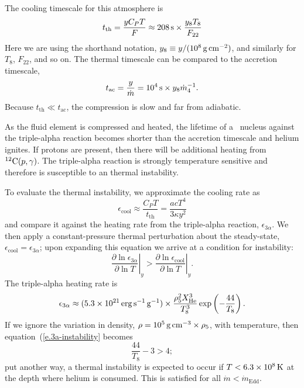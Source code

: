 The cooling timescale for this atmosphere is
\[ t_{\mathrm{th}} = \frac{yC_{P} T}{F} \approx 208\,\mathrm{s} \times \frac{y_{8} T_{8}}{F_{22}} \]
Here we are using the shorthand notation, $y_{8}\equiv y/(10^{8}\,\mathrm{g}\,{\mathrm{c}\mathrm{m}}^{-2})$, and similarly for $T_{8}$, $F_{22}$, and so on.
The thermal timescale can be compared to the accretion timescale,
\[ t_{\mathrm{ac}} = \frac{y}{\dot{m}} = 10^{4}\,\mathrm{s}\times y_{8}\dot{m}_{4}^{-1}.
\]
Because $t_{\mathrm{th}}\ll t_{\mathrm{ac}}$, the compression is slow and far from adiabatic.

As the fluid element is compressed and heated, the lifetime of a \helium\ nucleus against the triple-alpha reaction becomes shorter than the accretion timescale and helium ignites.  If protons are present, then there will be additional heating from $\mathrm{^{12}C}(p,\gamma)$.  The triple-alpha reaction is strongly temperature sensitive and therefore is susceptible to an thermal instability.

To evaluate the thermal instability, we approximate the cooling rate as
\begin{equation}\label{e.cooling-rate-approx}
\epsilon_{\mathrm{cool}} \approx \frac{C_{P}T}{t_{\mathrm{th}}} = \frac{ac T^{4}}{3\kappa y^{2}}
\end{equation}
and compare it against the heating rate from the triple-alpha reaction, $\epsilon_{3\alpha}$. We then apply a constant-pressure thermal perturbation about the steady-state, $\epsilon_{\mathrm{cool}} = \epsilon_{3\alpha}$; upon expanding this equation we arrive at a condition for instability:
\begin{equation}\label{e.3a-instability}
\left.\frac{\partial\ln\epsilon_{3\alpha}}{\partial\ln T}\right|_{y} > \left.\frac{\partial\ln\epsilon_{\mathrm{cool}}}{\partial\ln T}\right|_{y}.
\end{equation}
The triple-alpha heating rate is 
\[
	\epsilon_{3\alpha} \approx (5.3\times 10^{21}\,\mathrm{erg}\,{\mathrm{s}}^{-1}\,\mathrm{g}^{-1}) \times \frac{\rho_{5}^{2}X_{\mathrm{He}}^{3}}{T_{8}^{3}}\exp\left(-\frac{44}{T_{8}}\right).
\]
If we ignore the variation in density, $\rho = 10^{5}\,\mathrm{g}\,{\mathrm{c}\mathrm{m}}^{-3} \times \rho_{5}$, with temperature, then equation~(\ref{e.3a-instability} becomes
\begin{equation}\label{e.3a-instability-temperature}
\frac{44}{T_{8}} - 3 > 4;
\end{equation}
put another way, a thermal instability is expected to occur if $T < 6.3\times 10^{8}\,\mathrm{K}$ at the depth where helium is consumed.  This is satisfied for all $\dot{m}< \dot{m}_{\mathrm{Edd}}$.

